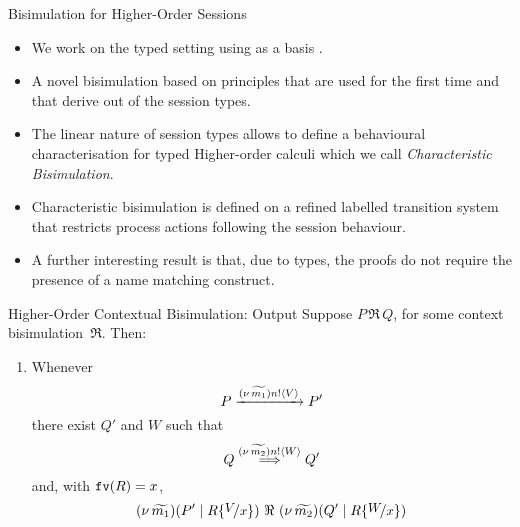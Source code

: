 \documentclass{beamer}
\begin{document}
	\begin{frame}{Bisimulation for Higher-Order Sessions}
		\begin{itemize}
			\item	We work on the typed setting using as a basis \HOp.

			\item	A novel bisimulation based on principles that are
				used for the first time and that derive out of the session types.

			\item	The linear nature of session types allows to define
				a behavioural characterisation for typed Higher-order calculi
				which we call {\em Characteristic Bisimulation}.

			\item	Characteristic bisimulation is defined on a refined labelled transition system
				that restricts process actions following the session behaviour.

			\item	A further interesting result is that, due to types, the proofs do
				not require the presence of a name matching construct.
		\end{itemize}
	\end{frame}

	\begin{frame}{Higher-Order Contextual Bisimulation: Output}
		Suppose $P \,\Re\, Q$, for some context bisimulation~$\Re$. Then:
		\begin{enumerate}[$(\star)$]
			\item	Whenever
				\[
					P \xrightarrow{(\nu\, \widetilde{m_1}) n ! \langle V \rangle} P'
				\]
				there exist $Q'$ and $W$ such that 
				\[
					Q \stackrel{(\nu\, \widetilde{m_2}) n ! \langle W \rangle}{\Longrightarrow} Q'
				\]
				and,   with $\mathtt{fv}(R)=x$, 
				\[
					\newsp{\widetilde{m_1}}{P' \Par R\subst{V}{x}}\ \Re\ \newsp{\widetilde{m_2}}{Q' \Par R\subst{W}{x}}
				\]
		\end{enumerate}
	\end{frame}
\end{document}
